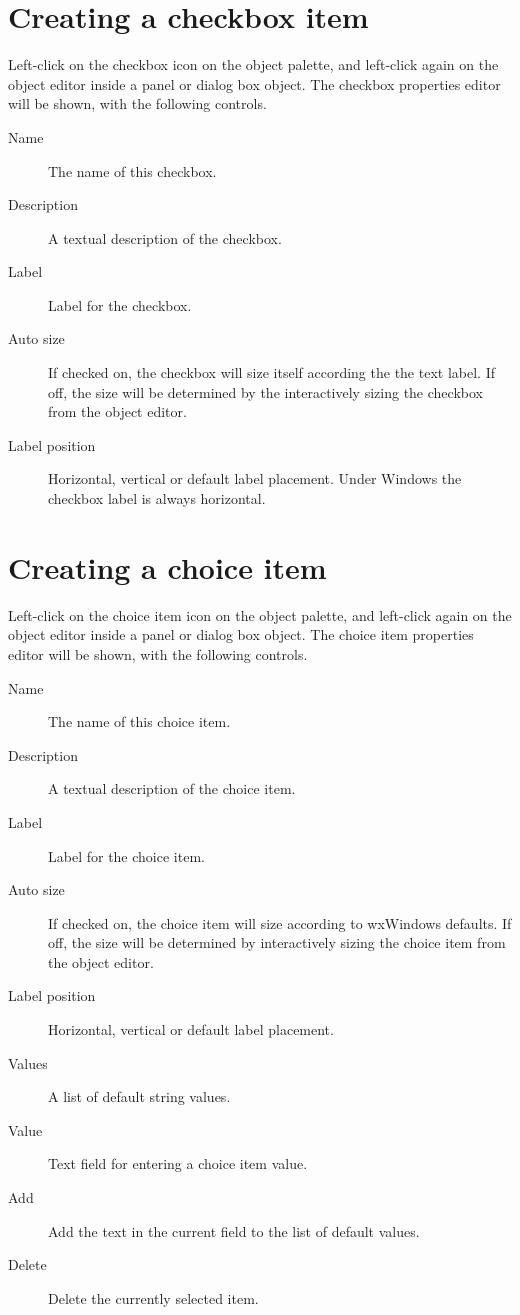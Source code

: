 \section{Creating a checkbox item}

Left-click on the checkbox icon on the object palette, and left-click
again on the object editor inside a panel or dialog box object. The
checkbox properties editor will be shown, with the following
controls.

\begin{description}
\item[Name] The name of this checkbox.
\item[Description] A textual description of the checkbox.
\item[Label] Label for the checkbox.
\item[Auto size] If checked on, the checkbox will size itself according the
the text label. If off, the size will be determined by the interactively sizing
the checkbox from the object editor.
\item[Label position] Horizontal, vertical or default label placement. Under Windows
the checkbox label is always horizontal.
\end{description}

\section{Creating a choice item}

Left-click on the choice item icon on the object palette, and left-click
again on the object editor inside a panel or dialog box object. The
choice item properties editor will be shown, with the following
controls.

\begin{description}
\item[Name] The name of this choice item.
\item[Description] A textual description of the choice item.
\item[Label] Label for the choice item.
\item[Auto size] If checked on, the choice item will size according to
wxWindows defaults. If off, the size will be determined by interactively sizing
the choice item from the object editor.
\item[Label position] Horizontal, vertical or default label placement.
\item[Values] A list of default string values.
\item[Value] Text field for entering a choice item value.
\item[Add] Add the text in the current field to the list of default values.
\item[Delete] Delete the currently selected item.
\end{description}

